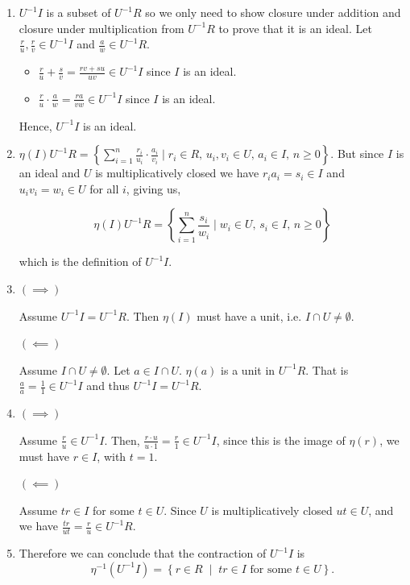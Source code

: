 \documentclass[Notebook.tex]{subfiles}
\begin{document}
\begin{solution}
	\bbni
	\begin{enumerate}
		\item $U^{-1}I$ is a subset of $U^{-1}R$ so we only need to show closure under addition and closure under multiplication from $U^{-1}R$ to prove that it is an ideal. Let $\frac{r}{u}, \frac{r}{v} \in U^{-1}I$ and $\frac{a}{w} \in U^{-1}R$. 
		\begin{itemize}
			\item $\frac{r}{u} + \frac{s}{v} = \frac{rv + su}{uv} \in U^{-1}I$ since $I$ is an ideal. 
			\item $\frac{r}{u} \cdot \frac{a}{w} = \frac{ra}{vw} \in U^{-1}I$ since $I$ is an ideal.  
		\end{itemize}
		Hence, $U^{-1}I$ is an ideal. 

		\item $\eta(I) U^{-1}R = \left\{\sum_{i=1}^{n} \frac{r_i}{u_i} \cdot \frac{a_i}{v_i} \mid r_i \in R,\,  u_i, v_i \in U, \, a_i \in I, \, n\geq 0 \right\}$. But since $I$ is an ideal and $U$ is multiplicatively closed we have $r_i a_i = s_i \in I$ and $u_i v_i = w_i \in U$ for all $i$, giving us, 
		
		\[\eta(I) U^{-1}R = \left\{\sum_{i=1}^{n} \frac{s_i}{w_i} \mid w_i \in U, \, s_i \in I, \, n\geq 0 \right\}\]
		
		which is the definition of $U^{-1}I$. 

		\item $(\implies)$ 
		
		Assume $U^{-1}I = U^{-1}R$. Then $\eta(I)$ must have a unit, i.e. $I \cap U \neq \emptyset$.  


		$(\impliedby)$

		Assume $I \cap U \neq \emptyset$. Let $a \in I \cap U$. $\eta(a)$ is a unit in $U^{-1}R$. That is $\frac{a}{a} = \frac{1}{1} \in U^{-1}I$ and thus $U^{-1}I = U^{-1}R$.
		

		\item $(\implies)$ 
		
		Assume $\frac{r}{u} \in U^{-1}I$. Then, $\frac{r \cdot u}{u \cdot 1} = \frac{r}{1} \in U^{-1}I$, since this is the image of $\eta(r)$, we must have $r \in I$, with $t =1$. 

		$(\impliedby)$

		Assume $tr \in I$ for some $t \in U$. Since $U$ is multiplicatively closed $ut \in U$, and we have $\frac{tr}{ut} = \frac{r}{u} \in U^{-1}R$. 

		\item Therefore we can conclude that the contraction of $U^{-1}I$ is 
		\[
		\eta^{-1}(U^{-1}I)=\left\{r\in R\;\; \big|\;\; tr\in I \text{ for some } t\in U\right\}.
		\]


\end{enumerate}
\end{solution}
\end{document}

